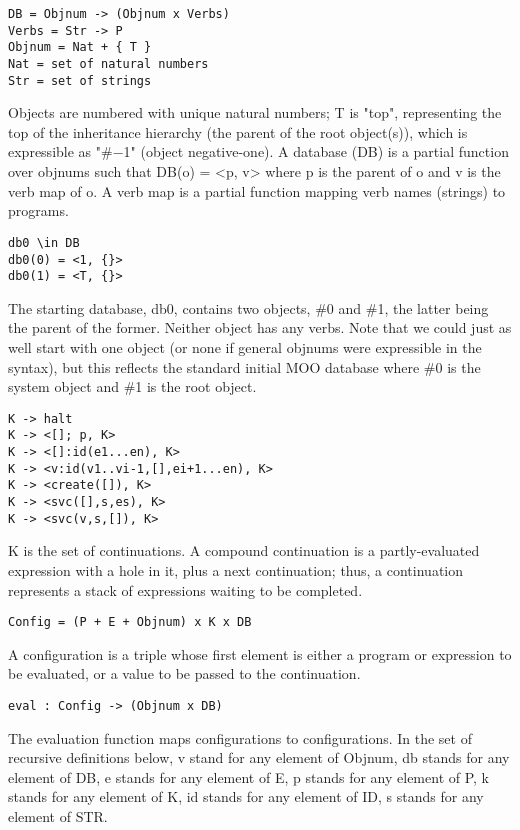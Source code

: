 \documentclass{article}
\begin{document}
\begin{verbatim}
DB = Objnum -> (Objnum x Verbs)
Verbs = Str -> P
Objnum = Nat + { T }
Nat = set of natural numbers
Str = set of strings
\end{verbatim}

Objects are numbered with unique natural numbers; T is "top",
representing the top of the inheritance hierarchy (the parent of the
root object(s)), which is expressible as "\#$-$1" (object
negative-one).  A database (DB) is a partial function over objnums
such that DB(o) = <p, v> where p is the parent of o and v is the verb
map of o.  A verb map is a partial function mapping verb names
(strings) to programs.

\begin{verbatim}
db0 \in DB
db0(0) = <1, {}>
db0(1) = <T, {}>
\end{verbatim}

The starting database, db0, contains two objects, \#0 and \#1, the
latter being the parent of the former.  Neither object has any verbs.
Note that we could just as well start with one object (or none if
general objnums were expressible in the syntax), but this reflects the
standard initial MOO database where \#0 is the system object and \#1 is
the root object.

\begin{verbatim}
K -> halt
K -> <[]; p, K>
K -> <[]:id(e1...en), K>
K -> <v:id(v1..vi-1,[],ei+1...en), K>
K -> <create([]), K>
K -> <svc([],s,es), K>
K -> <svc(v,s,[]), K>
\end{verbatim}

K is the set of continuations.  A compound continuation is a
partly-evaluated expression with a hole in it, plus a next
continuation; thus, a continuation represents a stack of expressions
waiting to be completed.

\begin{verbatim}
Config = (P + E + Objnum) x K x DB
\end{verbatim}

A configuration is a triple whose first element is either a program or 
expression to be evaluated, or a value to be passed to the continuation.

\begin{verbatim}
eval : Config -> (Objnum x DB)
\end{verbatim}

The evaluation function maps configurations to configurations.  In the 
set of recursive definitions below, v stand for any element of Objnum,
db stands for any element of DB, e stands for any element of E, p stands 
for any element of P, k stands for any element of K, id stands for any 
element of ID, s stands for any element of STR.
\end{document}
